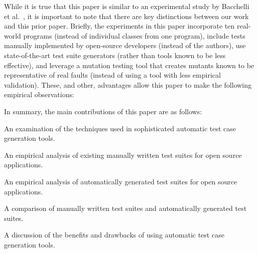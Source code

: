 
While it is true that this paper is similar to an experimental study by Bacchelli et al.~\cite{bacchelli2008}, it is important to note that there are key distinctions between our work and this prior paper.  Briefly, the experiments in this paper incorporate ten real-world programs (instead of individual classes from one program), include tests manually implemented by open-source developers (instead of the authors), use state-of-the-art test suite generators (rather than tools known to be less effective), and leverage a mutation testing tool that creates mutants known to be representative of real faults (instead of using a tool with less empirical validation).  These, and other, advantages allow this paper to make the following empirical observations:



In summary, the main contributions of this paper are as follows:
\squishlist 
\item An examination of the techniques used in sophisticated automatic test case generation tools.
\item An empirical analysis of existing manually written test suites for open source applications.
\item An empirical analysis of automatically generated test suites for open source applications.
\item A comparison of manually written test suites and automatically generated test suites.
\item A discussion of the benefits and drawbacks of using automatic test case generation tools.
\squishend 

